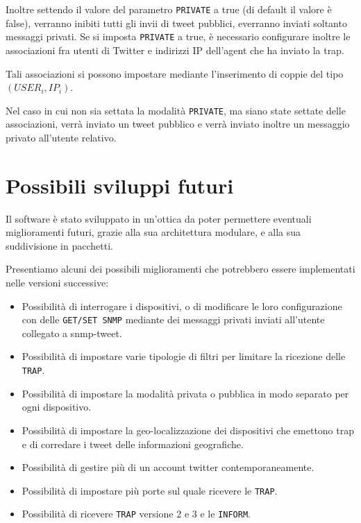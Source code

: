 \documentclass[a4paper, 10pt]{article}
\begin{document}
Inoltre settendo il valore del parametro \texttt{PRIVATE} a true (di default il valore \`e false), verranno inibiti tutti gli invii di tweet pubblici, everranno inviati soltanto messaggi privati. Se si imposta \texttt{PRIVATE} a true, \`e necessario configurare inoltre le associazioni fra utenti di Twitter e indirizzi IP dell'agent che ha inviato la trap.

Tali associazioni si possono impostare mediante l'inserimento di coppie del tipo $(USER_i, IP_i)$.

Nel caso in cui non sia settata la modalit\`a \texttt{PRIVATE}, ma siano state settate delle associazioni, verr\`a inviato un tweet pubblico e verr\`a inviato inoltre un messaggio privato all'utente relativo.

\section{Possibili sviluppi futuri}

Il software \`e stato sviluppato in un'ottica da poter permettere eventuali miglioramenti futuri, grazie alla sua architettura modulare, e alla sua suddivisione in pacchetti.

Presentiamo alcuni dei possibili miglioramenti che potrebbero essere implementati nelle versioni successive:

\begin{itemize}
	\item Possibilit\`a di interrogare i dispositivi, o di modificare le loro configurazione con delle \texttt{GET/SET SNMP} mediante dei messaggi privati inviati all'utente collegato a snmp-tweet.
	\item Possibilit\`a di impostare varie tipologie di filtri per limitare la ricezione delle \texttt{TRAP}.
	\item Possibilit\`a di impostare la modalit\`a privata o pubblica in modo separato per ogni dispositivo.
	\item Possibilit\`a di impostare la geo-localizzazione dei dispositivi che emettono trap e di corredare i tweet delle informazioni geografiche.
	\item Possibilit\`a di gestire pi\`u di un account twitter contemporaneamente.
	\item Possibilit\`a di impostare pi\`u porte sul quale ricevere le \texttt{TRAP}.
	\item Possibilit\`a di ricevere \texttt{TRAP} versione 2 e 3 e le \texttt{INFORM}.
\end{itemize}
\end{document}
